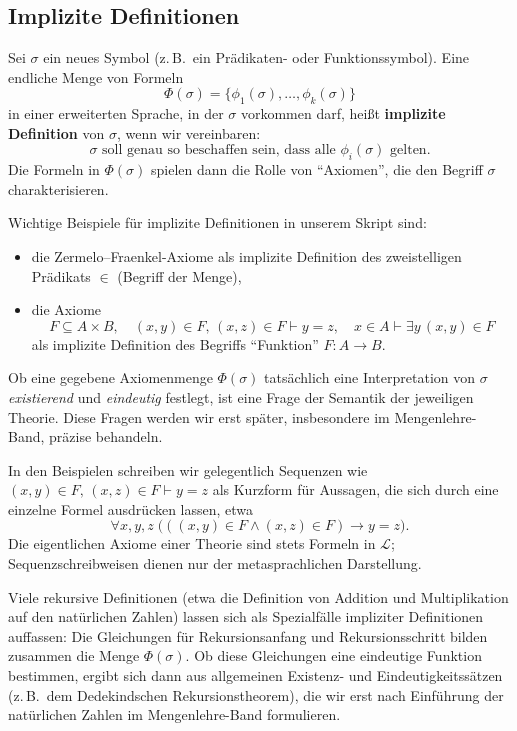\documentclass[main.tex]{subfiles}
\begin{document}
\subsection{Implizite Definitionen}

\begin{definition}
Sei \(\sigma\) ein neues Symbol (z.\,B.\ ein Prädikaten- oder
Funktionssymbol). Eine endliche Menge von Formeln
\[
  \Phi(\sigma) = \{\phi_1(\sigma),\dots,\phi_k(\sigma)\}
\]
in einer erweiterten Sprache, in der \(\sigma\) vorkommen darf,
heißt \textbf{implizite Definition} von \(\sigma\), wenn wir
vereinbaren:
\[
  \sigma \text{ soll genau so beschaffen sein, dass alle }
  \phi_i(\sigma) \text{ gelten.}
\]
Die Formeln in \(\Phi(\sigma)\) spielen dann die Rolle von
\enquote{Axiomen}, die den Begriff \(\sigma\) charakterisieren.
\end{definition}

\begin{remark}
Wichtige Beispiele für implizite Definitionen in unserem Skript
sind:
\begin{itemize}
  \item die Zermelo–Fraenkel-Axiome als implizite Definition
        des zweistelligen Prädikats \(\in\) (Begriff der Menge),
  \item die Axiome
        \[
          F \subseteq A \times B,\quad
          (x,y)\in F,\,(x,z)\in F \vdash y=z,\quad
          x\in A \vdash \exists y\,(x,y)\in F
        \]
        als implizite Definition des Begriffs \enquote{Funktion}
        \(F\colon A\to B\).
\end{itemize}
Ob eine gegebene Axiomenmenge \(\Phi(\sigma)\) tatsächlich eine
Interpretation von \(\sigma\) \emph{existierend} und
\emph{eindeutig} festlegt, ist eine Frage der Semantik der
jeweiligen Theorie. Diese Fragen werden wir erst später, insbesondere
im Mengenlehre-Band, präzise behandeln.

In den Beispielen schreiben wir gelegentlich Sequenzen wie
\((x,y)\in F,\,(x,z)\in F \vdash y=z\) als Kurzform für Aussagen,
die sich durch eine einzelne Formel ausdrücken lassen, etwa
\[
  \forall x,y,z\;\bigl(((x,y)\in F \land (x,z)\in F) \rightarrow y=z\bigr).
\]
Die eigentlichen Axiome einer Theorie sind stets Formeln in
\(\mathcal L\); Sequenzschreibweisen dienen nur der
metasprachlichen Darstellung.
\end{remark}

\begin{remark}
Viele rekursive Definitionen (etwa die Definition von Addition
und Multiplikation auf den natürlichen Zahlen) lassen sich als
Spezialfälle impliziter Definitionen auffassen: Die Gleichungen
für Rekursionsanfang und Rekursionsschritt bilden zusammen die
Menge \(\Phi(\sigma)\). Ob diese Gleichungen eine eindeutige
Funktion bestimmen, ergibt sich dann aus allgemeinen Existenz- und
Eindeutigkeitssätzen (z.\,B.\ dem Dedekindschen
Rekursionstheorem), die wir erst nach Einführung der natürlichen
Zahlen im Mengenlehre-Band formulieren.
\end{remark}
\end{document}
